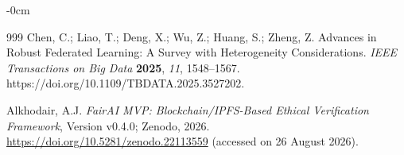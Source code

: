 \documentclass[futureinternet,article,submit,pdftex,moreauthors]{Definitions/mdpi}
\begin{document}
\begin{adjustwidth}{-\extralength}{0cm}
\begin{thebibliography}{999}
Chen, C.; Liao, T.; Deng, X.; Wu, Z.; Huang, S.; Zheng, Z.
Advances in Robust Federated Learning: A Survey with Heterogeneity Considerations.
\textit{IEEE Transactions on Big Data} \textbf{2025}, \textit{11}, 1548--1567.
https://doi.org/10.1109/TBDATA.2025.3527202.

Alkhodair, A.J.
\textit{FairAI MVP: Blockchain/IPFS-Based Ethical Verification Framework},
Version v0.4.0; Zenodo, 2026.
\url{https://doi.org/10.5281/zenodo.22113559}
(accessed on 26 August 2026).
		
\end{thebibliography}
	
	\PublishersNote{}
	\end{adjustwidth}
	
\end{document}
